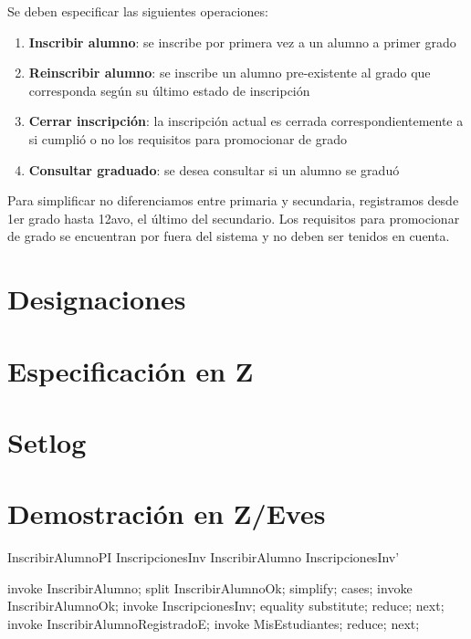 \documentclass{article}
\begin{document}
Se deben especificar las siguientes operaciones:

\begin{enumerate}
  \item \textbf{Inscribir alumno}: se inscribe por primera vez a un alumno a primer grado
  
  \item \textbf{Reinscribir alumno}: se inscribe un alumno pre-existente al grado que corresponda según su último estado de inscripción
  
  \item \textbf{Cerrar inscripción}: la inscripción actual es cerrada correspondientemente a si cumplió o no los requisitos para promocionar de grado
  
  \item \textbf{Consultar graduado}: se desea consultar si un alumno se graduó
\end{enumerate}

Para simplificar no diferenciamos entre primaria y secundaria, registramos desde 1er grado hasta 12avo, el último del secundario. Los requisitos para promocionar de grado se encuentran por fuera del sistema y no deben ser tenidos en cuenta.

\section*{Designaciones}

\section*{Especificación en Z}


\section*{Setlog}

\section*{Demostración en Z/Eves}
\begin{theorem}{InscribirAlumnoPI}
  InscripcionesInv \land InscribirAlumno \implies InscripcionesInv'
\end{theorem}

\begin{zproof}[InscribirAlumnoPI]
  invoke InscribirAlumno;
  split InscribirAlumnoOk;
  simplify;
  cases;
  invoke InscribirAlumnoOk;
  invoke InscripcionesInv;
  equality substitute;
  reduce;
  next;
  invoke InscribirAlumnoRegistradoE;
  invoke \Xi MisEstudiantes;
  reduce;
  next;
\end{zproof}
\end{document}
